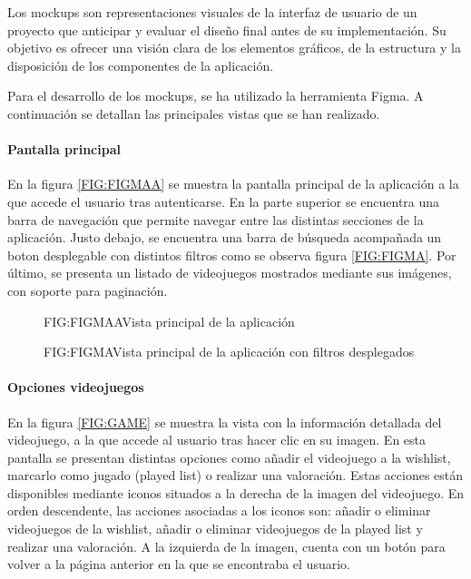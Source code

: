 Los mockups son representaciones visuales de la interfaz de usuario de un proyecto que 
anticipar y evaluar el diseño final antes de su implementación. Su objetivo es ofrecer una visión clara de los elementos gráficos, de la 
estructura y la disposición de los componentes de la aplicación. 

Para el desarrollo de los mockups, se ha utilizado la herramienta Figma. A continuación se detallan 
las principales vistas que se han realizado. 

\paragraph{Pantalla principal}
En la figura \ref{FIG:FIGMAA} se muestra la pantalla principal de la aplicación a la que accede el usuario tras autenticarse. 
En la parte superior se encuentra una barra de navegación que permite navegar entre las distintas
secciones de la aplicación. Justo debajo, se encuentra una barra de búsqueda acompañada un boton desplegable 
con distintos filtros como se observa figura \ref{FIG:FIGMA}. Por último, se presenta un listado de videojuegos mostrados 
mediante sus imágenes, con soporte para paginación.

\begin{figure}[Vista principal]{FIG:FIGMAA}{Vista principal de la aplicación}
\end{figure}

\begin{figure}[Vista principal con filtros]{FIG:FIGMA}{Vista principal de la aplicación con filtros desplegados}
\end{figure}

\paragraph{Opciones videojuegos}
En la figura \ref{FIG:GAME} se muestra la vista con la información detallada del videojuego, a la que accede al usuario tras hacer clic en 
su imagen. En esta pantalla se presentan distintas opciones como añadir el videojuego a la wishlist, marcarlo como jugado (played list) o 
realizar una valoración. Estas acciones están disponibles mediante iconos situados a la derecha de la imagen del videojuego. En orden descendente, 
las acciones asociadas a los iconos son: añadir o eliminar videojuegos de la wishlist, añadir o eliminar videojuegos de la played list y realizar una valoración.
A la izquierda de la imagen, cuenta con un botón para volver a la página anterior en la que se encontraba el usuario.

